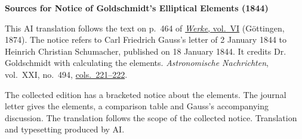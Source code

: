 \clearpage\thispagestyle{empty}
\begin{center}\textbf{Sources for Notice of Goldschmidt’s Elliptical Elements (1844)}\end{center}
\noindent This AI translation follows the text on p.~464 of \href{https://gdz.sub.uni-goettingen.de/id/PPN236007467}{\textit{Werke}, vol.~VI} (Göttingen, 1874). The notice refers to Carl Friedrich Gauss’s letter of 2 January 1844 to Heinrich Christian Schumacher, published on 18 January 1844. It credits Dr. Goldschmidt with calculating the elements. \textit{Astronomische Nachrichten}, vol.~XXI, no.~494, \href{https://api.digitale-sammlungen.de/iiif/image/v2/bsb10049446_00119/full/1800,/0/default.jpg}{cols.~221--222}.
\par\smallskip\noindent The collected edition has a bracketed notice about the elements. The journal letter gives the elements, a comparison table and Gauss’s accompanying discussion. The translation follows the scope of the collected notice. Translation and typesetting produced by AI.
\clearpage
